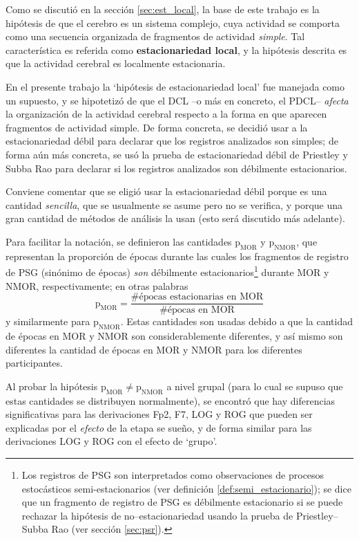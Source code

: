 \documentclass[12pt,letterpaper]{book}
\begin{document}
Como se discutió en la sección \ref{sec:est_local}, la base de este trabajo es la hipótesis de que el cerebro es un sistema complejo, cuya actividad se comporta como una secuencia organizada de fragmentos de actividad \textit{simple}.
%
Tal característica es referida como \textbf{estacionariedad local}, y la hipótesis descrita es que la actividad cerebral es localmente estacionaria.

En el presente trabajo la `hipótesis de estacionariedad local' fue manejada como un supuesto, y se hipotetizó de que el DCL --o más en concreto, el PDCL-- \textit{afecta} la organización de la actividad cerebral respecto a la forma en que aparecen fragmentos de actividad simple.
%
De forma concreta, se decidió usar a la estacionariedad débil para declarar que los registros analizados son simples; de forma aún más concreta, se usó la prueba de estacionariedad débil de Priestley y Subba Rao para declarar si los registros analizados son débilmente estacionarios.

Conviene comentar que se eligió usar la estacionariedad débil porque es una cantidad \textit{sencilla}, que se usualmente se asume pero no se verifica, y porque una gran cantidad de métodos de análisis la usan (esto será discutido más adelante).

Para facilitar la notación, se definieron las cantidades $\text{p}_{\text{MOR}}$ y $\text{p}_{\text{NMOR}}$, que representan la proporción de épocas durante las cuales los fragmentos de registro de PSG (sinónimo de épocas) \textit{son} débilmente estacionarios\footnote{Los registros de PSG son interpretados como observaciones de procesos estocásticos semi-estacionarios (ver definición \ref{def:semi_estacionario}); se dice que un fragmento de registro de PSG es débilmente estacionario si se puede rechazar la hipótesis de no--estacionariedad usando la prueba de Priestley--Subba Rao (ver sección \ref{sec:psr}).} durante MOR y NMOR, respectivamente; en otras palabras
\begin{equation}
\text{p}_{\text{MOR}} = \frac{\text{\# épocas estacionarias en MOR}}{\text{\# épocas en MOR}}
\end{equation}
y similarmente para $\text{p}_{\text{NMOR}}$. 
%
Estas cantidades son usadas debido a que la cantidad de épocas en MOR y NMOR son considerablemente diferentes, y así mismo son diferentes la cantidad de épocas en MOR y NMOR para los diferentes participantes.

Al probar la hipótesis $\text{p}_{\text{MOR}} \neq \text{p}_{\text{NMOR}}$ a nivel grupal (para lo cual se supuso que estas cantidades se distribuyen normalmente), se  encontró que hay diferencias significativas para las derivaciones Fp2, F7, LOG y ROG que pueden ser explicadas por el \textit{efecto} de la etapa se sueño, y de forma similar para las derivaciones LOG y ROG con el efecto de `grupo'.
\end{document}
